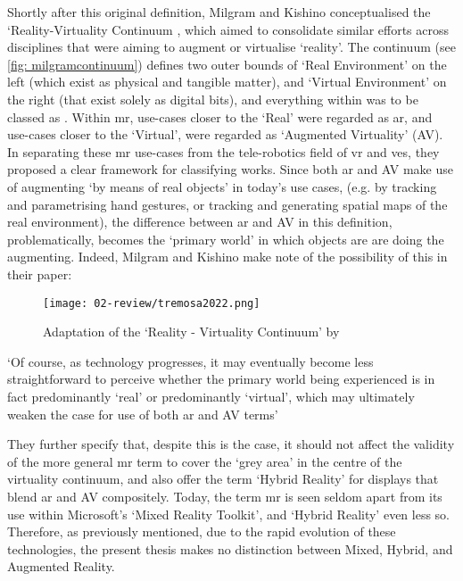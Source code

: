 Shortly after this original definition, Milgram and Kishino conceptualised the `Reality-Virtuality Continuum \citeyearpar{milgram1994}, which aimed to consolidate similar efforts across disciplines that were aiming to augment or virtualise `reality'. The continuum (see \autoref{fig: milgramcontinuum}) defines two outer bounds of `Real Environment' on the left (which exist as physical and tangible matter), and `Virtual Environment' on the right (that exist solely as digital bits), and everything within was to be classed as . Within \gls{mr}, use-cases closer to the `Real' were regarded as \gls{ar}, and use-cases closer to the `Virtual', were regarded as `Augmented Virtuality' (AV). In separating these \gls{mr} use-cases from the tele-robotics field of \gls{vr} and \glspl{ve}, they proposed a clear framework for classifying works. Since both \gls{ar} and AV make use of augmenting `by means of real objects' in today's use cases, (e.g. by tracking and parametrising hand gestures, or tracking and generating spatial maps of the real environment), the difference between \gls{ar} and AV in this definition, problematically, becomes the `primary world' in which objects are are doing the augmenting. Indeed, Milgram and Kishino make note of the possibility of this in their paper: 

\begin{figure}[ht]
    \centering
    \texttt{[image: 02-review/tremosa2022.png]}
    \captionsetup{justification=centering,margin=1.5cm}
    \caption{Adaptation of the `Reality - Virtuality Continuum' by \citeauthor{milgram1994} \citep[in][]{tremosa2022}}\label{fig: milgramcontinuum}
\end{figure}

`Of course, as technology progresses, it may eventually become less straightforward to perceive whether the primary world being experienced is in fact predominantly `real' or predominantly `virtual', which may ultimately weaken the case for use of both \gls{ar} and AV terms'

They further specify that, despite this is the case, it should not affect the validity of the more general \gls{mr} term to cover the `grey area' in the centre of the virtuality continuum, and also offer the term `Hybrid Reality' for displays that blend \gls{ar} and AV compositely. Today, the term \gls{mr} is seen seldom apart from its use within Microsoft's `Mixed Reality Toolkit', and `Hybrid Reality' even less so. Therefore, as previously mentioned, due to the rapid evolution of these technologies, the present thesis makes no distinction between Mixed, Hybrid, and Augmented Reality.

